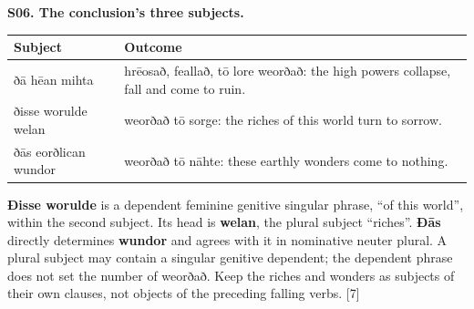 \par\begin{minipage}{\linewidth}\raggedright
\textbf{S06. The conclusion's three subjects.}

\par\begingroup
\fontsize{10.5}{13.2}\selectfont
\setlength{\LTleft}{0pt}\setlength{\LTright}{\fill}
\noindent
\begin{tabular}{@{}>{\raggedright\arraybackslash}p{30.05mm}>{\raggedright\arraybackslash}p{91.13mm}@{}}
\toprule
\textbf{Subject} & \textbf{Outcome} \\
\midrule
ðā hēan mihta & hrēosað, feallað, tō lore weorðað: the high powers collapse, fall and come to ruin. \\
ðisse worulde welan & weorðað tō sorge: the riches of this world turn to sorrow. \\
ðās eorðlican wundor & weorðað tō nāhte: these earthly wonders come to nothing. \\
\bottomrule
\end{tabular}
\par\endgroup

\textbf{Ðisse worulde} is a dependent feminine genitive singular phrase, “of this world”, within the second subject. Its head is \textbf{welan}, the plural subject “riches”. \textbf{Ðās} directly determines \textbf{wundor} and agrees with it in nominative neuter plural. A plural subject may contain a singular genitive dependent; the dependent phrase does not set the number of weorðað. Keep the riches and wonders as subjects of their own clauses, not objects of the preceding falling verbs. [7]

\end{minipage}\par\addvspace{4pt}

